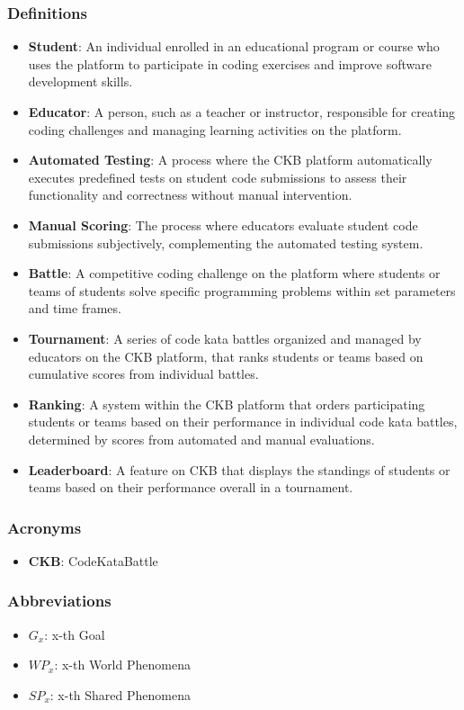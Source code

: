 \subsubsection{Definitions}
\begin{itemize}
    \item \textbf{Student}: An individual enrolled in an educational program or course who uses the platform to participate in coding exercises and improve software development skills.
    \item \textbf{Educator}: A person, such as a teacher or instructor, responsible for creating coding challenges and managing learning activities on the platform.
    \item \textbf{Automated Testing}: A process where the CKB platform automatically executes predefined tests on student code submissions to assess their functionality and correctness without manual intervention.
    \item \textbf{Manual Scoring}: The process where educators evaluate student code submissions subjectively, complementing the automated testing system.
    \item \textbf{Battle}: A competitive coding challenge on the platform where students or teams of students solve specific programming problems within set parameters and time frames.
    \item \textbf{Tournament}: A series of code kata battles organized and managed by educators on the CKB platform, that ranks students or teams based on cumulative scores from individual battles.
    \item \textbf{Ranking}: A system within the CKB platform that orders participating students or teams based on their performance in individual code kata battles, determined by scores from automated and manual evaluations.
    \item \textbf{Leaderboard}: A feature on CKB that displays the standings of students or teams based on their performance overall in a tournament.
\end{itemize}

\subsubsection{Acronyms}
\begin{itemize}
    \item \textbf{CKB}: CodeKataBattle
\end{itemize}

\subsubsection{Abbreviations}
\begin{itemize}
    \item $G_{x}$: x-th Goal
    \item $WP_{x}$: x-th World Phenomena
    \item $SP_{x}$: x-th Shared Phenomena
\end{itemize}